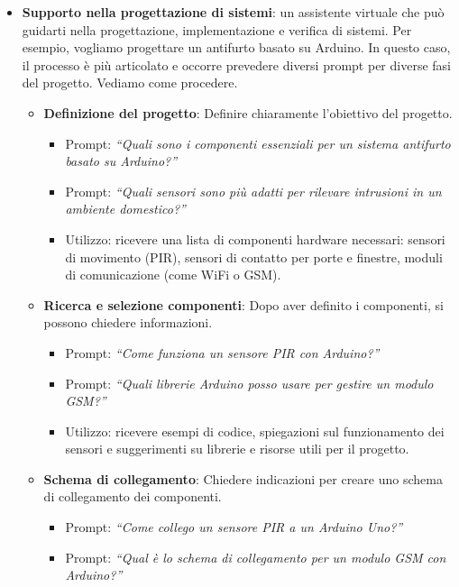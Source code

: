 \begin{itemize}
                \item \textbf{Supporto nella progettazione di sistemi}: un assistente virtuale che può guidarti nella progettazione, implementazione e verifica di sistemi. Per esempio, vogliamo progettare un antifurto basato su Arduino. In questo caso, il processo è più articolato e occorre prevedere diversi prompt per diverse fasi del progetto. Vediamo come procedere. 
                \begin{itemize}
                    \item \textbf{Definizione del progetto}: Definire chiaramente l'obiettivo del progetto.
                    \begin{itemize}
                        \item Prompt: \textit{``Quali sono i componenti essenziali per un sistema antifurto basato su Arduino?''}
                        \item Prompt: \textit{``Quali sensori sono più adatti per rilevare intrusioni in un ambiente domestico?''}
                        \item Utilizzo: ricevere una lista di componenti hardware necessari: sensori di movimento (PIR), sensori di contatto per porte e finestre, moduli di comunicazione (come WiFi o GSM).
                    \end{itemize}
                    \item \textbf{Ricerca e selezione componenti}: Dopo aver definito i componenti, si possono chiedere informazioni. 
                    \begin{itemize}
                        \item Prompt: \textit{``Come funziona un sensore PIR con Arduino?''}
                        \item Prompt: \textit{``Quali librerie Arduino posso usare per gestire un modulo GSM?''}
                        \item Utilizzo: ricevere esempi di codice, spiegazioni sul funzionamento dei sensori e suggerimenti su librerie e risorse utili per il progetto.
                    \end{itemize}
                    \item \textbf{Schema di collegamento}: Chiedere indicazioni per creare uno schema di collegamento dei componenti.  
                    \begin{itemize}
                        \item Prompt: \textit{``Come collego un sensore PIR a un Arduino Uno?''}
                        \item Prompt: \textit{``Qual è lo schema di collegamento per un modulo GSM con Arduino?''}

\end{itemize}
\end{itemize}
\end{itemize}
